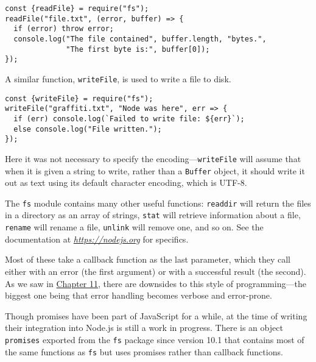 \begin{lstlisting}
const {readFile} = require("fs");
readFile("file.txt", (error, buffer) => {
  if (error) throw error;
  console.log("The file contained", buffer.length, "bytes.",
              "The first byte is:", buffer[0]);
});
\end{lstlisting}
\noindent{}

A similar function, \lstinline`writeFile`, is used to write a file to disk.

\begin{lstlisting}
const {writeFile} = require("fs");
writeFile("graffiti.txt", "Node was here", err => {
  if (err) console.log(`Failed to write file: ${err}`);
  else console.log("File written.");
});
\end{lstlisting}
\noindent{}

Here it was not necessary to specify the encoding—\lstinline`writeFile` will assume that when it is given a string to write, rather than a \lstinline`Buffer` object, it should write it out as text using its default character encoding, which is UTF-8.

The \lstinline`fs` module contains many other useful functions: \lstinline`readdir` will return the files in a directory as an array of strings, \lstinline`stat` will retrieve information about a file, \lstinline`rename` will rename a file, \lstinline`unlink` will remove one, and so on. See the documentation at \href{https://nodejs.org}{\emph{https://nodejs.org}} for specifics.

Most of these take a callback function as the last parameter, which they call either with an error (the first argument) or with a successful result (the second). As we saw in \hyperref[async]{Chapter 11}, there are downsides to this style of programming—the biggest one being that error handling becomes verbose and error-prone.

Though promises have been part of JavaScript for a while, at the time of writing their integration into Node.js is still a work in progress. There is an object \lstinline`promises` exported from the \lstinline`fs` package since version 10.1 that contains most of the same functions as \lstinline`fs` but uses promises rather than callback functions.

